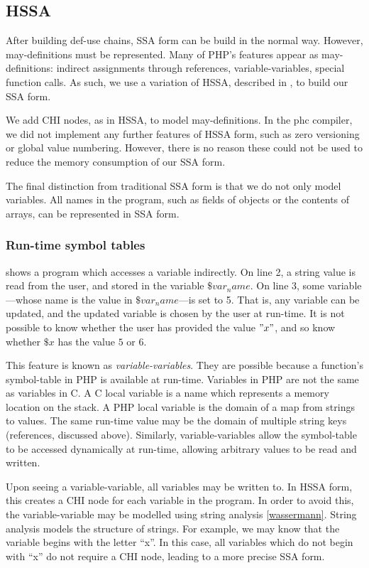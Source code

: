 {\subsection{HSSA}

After building def-use chains, SSA form can be build in the normal way.
However, may-definitions must be represented.
Many of PHP's features appear as may-definitions: indirect assignments through references, variable-variables, special function calls.
As such, we use a variation of HSSA, described in , to build our SSA form.

We add CHI nodes, as in HSSA, to model may-definitions.
In the phc compiler, we did not implement any further features of HSSA form, such as zero versioning or global value numbering.
However, there is no reason these could not be used to reduce the memory consumption of our SSA form.

The final distinction from traditional SSA form is that we do not only model variables.
All names in the program, such as fields of objects or the contents of arrays, can be represented in SSA form.


\subsubsection{Run-time symbol tables}


 shows a program which accesses a variable indirectly.
On line 2, a string value is read from the user, and stored in the variable $\$var_name$.
On line 3, some variable---whose name is the value in $\$var_name$---is set to 5.
That is, any variable can be updated, and the updated variable is chosen by the user at run-time.
It is not possible to know whether the user has provided the value $"x"$, and so know whether $\$x$ has the value $5$ or $6$.

This feature is known as \textit{variable-variables}.
They are possible because a function's symbol-table in PHP is available at run-time.
Variables in PHP are not the same as variables in C.
A C local variable is a name which represents a memory location on the stack.
A PHP local variable is the domain of a map from strings to values.
The same run-time value may be the domain of multiple string keys (references, discussed above).
Similarly, variable-variables allow the symbol-table to be accessed dynamically at run-time, allowing arbitrary values to be read and written.

Upon seeing a variable-variable, all variables may be written to.
In HSSA form, this creates a CHI node for each variable in the program.
In order to avoid this, the variable-variable may be modelled using string analysis \ref{wassermann}.
String analysis models the structure of strings.
For example, we may know that the variable begins with the letter ``x''.
In this case, all variables which do not begin with ``x'' do not require a CHI node, leading to a more precise SSA form.

}
